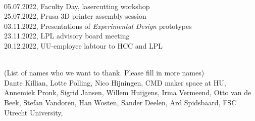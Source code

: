 \documentclass{report}
\begin{document}
 \\

05.07.2022, Faculty Day, lasercutting workshop\\
25.07.2022, Prusa 3D printer assembly session\\
03.11.2022, Presentations of \textit{Experimental Design} prototypes\\
23.11.2022, LPL advisory board meeting\\
20.12.2022, UU-employee labtour to HCC and LPL\\

\clearpage
\begin{figure}
    \centering
\end{figure}
\clearpage

 \\

(List of names who we want to thank. Please fill in more names)\\

Dante Killian, Lotte Polling, Nico Hijningen, CMD maker space at HU, Annemiek Pronk, Sigrid Jansen, Willem Huijgens, Irma Vermeend, Otto van de Beek, Stefan Vandoren, Han Wosten, Sander Deelen, Ard Spidsbaard, FSC Utrecht University, 
\end{document}
